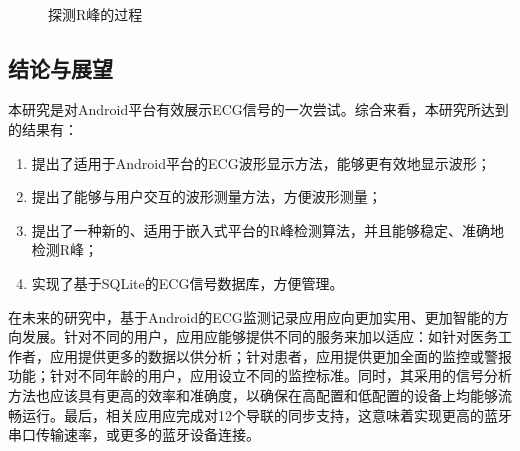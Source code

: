 \begin{figure}[htb]
  \centering
  \\
    \caption{探测R峰的过程}
  \label{fig5-1} %
\end{figure}

\subsection{结论与展望}
本研究是对Android平台有效展示ECG信号的一次尝试。综合来看，本研究所达到的结果有：
\begin{enumerate}
\item 提出了适用于Android平台的ECG波形显示方法，能够更有效地显示波形；
\item 提出了能够与用户交互的波形测量方法，方便波形测量；
\item 提出了一种新的、适用于嵌入式平台的R峰检测算法，并且能够稳定、准确地检测R峰；
\item 实现了基于SQLite的ECG信号数据库，方便管理。
\end{enumerate}

在未来的研究中，基于Android的ECG监测记录应用应向更加实用、更加智能的方向发展。针对不同的用户，应用应能够提供不同的服务来加以适应：如针对医务工作者，应用提供更多的数据以供分析；针对患者，应用提供更加全面的监控或警报功能；针对不同年龄的用户，应用设立不同的监控标准。同时，其采用的信号分析方法也应该具有更高的效率和准确度，以确保在高配置和低配置的设备上均能够流畅运行。最后，相关应用应完成对12个导联的同步支持，这意味着实现更高的蓝牙串口传输速率，或更多的蓝牙设备连接。
